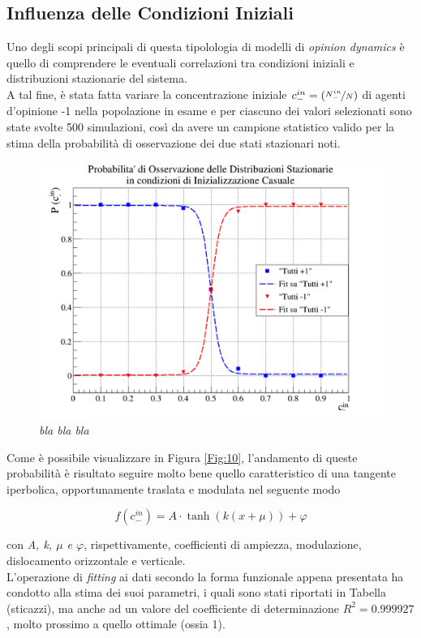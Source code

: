 \documentclass{article}
\begin{document}
\subsection{Influenza delle Condizioni Iniziali}
\label{Sec:4.4}

Uno degli scopi principali di questa tipolologia di modelli di \textit{opinion dynamics} è quello di comprendere le eventuali correlazioni tra condizioni iniziali e distribuzioni stazionarie del sistema.
\\ A tal fine, è stata fatta variare la concentrazione iniziale $c_{-}^{in} = (\nicefrac{N_{-}^{in}}{N})$ di agenti d'opinione -1 nella popolazione in esame e per ciascuno dei valori selezionati sono state svolte 500 simulazioni, così da avere un campione statistico valido per la stima della probabilità di osservazione dei due stati stazionari noti.

\begin{figure}[h]
\centering
\includegraphics[width = \linewidth]{random_prob_graph.png}
\caption{\textit{bla bla bla}}
\label{Fig:11}
\end{figure}

Come è possibile visualizzare in Figura \ref{Fig:10}, l'andamento di queste probabilità è risultato seguire molto bene quello caratteristico di una tangente iperbolica, opportunamente traslata e modulata nel seguente modo

\begin{equation}
f(c_{-}^{in}) = A \cdot \tanh(k(x+\mu))+\varphi
\label{Eq:12}
\end{equation}

con \textit{A, k, $\mu$ e $\varphi$}, rispettivamente, coefficienti di ampiezza, modulazione, dislocamento orizzontale e verticale.
\\ L'operazione di \textit{fitting} ai dati secondo la forma funzionale appena presentata ha condotto alla stima dei suoi parametri, i quali sono stati riportati in Tabella (sticazzi), ma anche ad un valore del coefficiente di determinazione $R^2 = 0.999927$, molto prossimo a quello ottimale (ossia 1).
\end{document}
